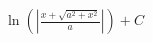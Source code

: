 \documentclass[preview]{standalone}
\begin{document}
\begin{align*}
\ln(|\frac{x+\sqrt{a^2+x^2}}{a}|)+C
\end{align*}
\end{document}
